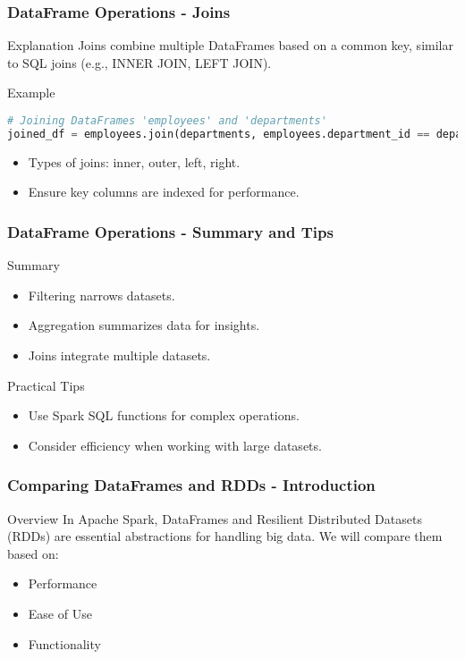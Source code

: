 \documentclass[aspectratio=169]{beamer}
\begin{document}
\begin{frame}[fragile]
    \frametitle{DataFrame Operations - Joins}
    \begin{block}{Explanation}
        Joins combine multiple DataFrames based on a common key, similar to SQL joins (e.g., INNER JOIN, LEFT JOIN).
    \end{block}
    
    \begin{block}{Example}
        \begin{lstlisting}[language=Python]
# Joining DataFrames 'employees' and 'departments'
joined_df = employees.join(departments, employees.department_id == departments.id, "inner")
        \end{lstlisting}
    \end{block}
    
    \begin{itemize}
        \item Types of joins: inner, outer, left, right.
        \item Ensure key columns are indexed for performance.
    \end{itemize}
\end{frame}

\begin{frame}
    \frametitle{DataFrame Operations - Summary and Tips}
    \begin{block}{Summary}
        \begin{itemize}
            \item Filtering narrows datasets.
            \item Aggregation summarizes data for insights.
            \item Joins integrate multiple datasets.
        \end{itemize}
    \end{block}
    
    \begin{block}{Practical Tips}
        \begin{itemize}
            \item Use Spark SQL functions for complex operations.
            \item Consider efficiency when working with large datasets.
        \end{itemize}
    \end{block}
\end{frame}

\begin{frame}[fragile]
    \frametitle{Comparing DataFrames and RDDs - Introduction}
    \begin{block}{Overview}
        In Apache Spark, DataFrames and Resilient Distributed Datasets (RDDs) are essential abstractions for handling big data. 
        We will compare them based on:
        \begin{itemize}
            \item Performance
            \item Ease of Use
            \item Functionality
        \end{itemize}
    \end{block}
\end{frame}
\end{document}
